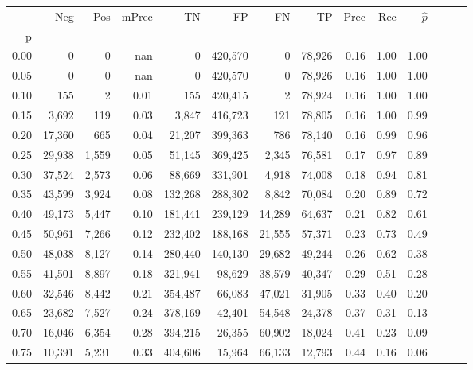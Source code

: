 \begin{tabular}{rrrrrrrrrrrrrr}
\toprule
{} &     Neg &    Pos & mPrec &       TN &       FP &      FN &      TP &  Prec &   Rec & $\hat{p}$ \\
p    &         &        &       &          &          &         &         &       &       &           \\
\midrule
0.00 &       0 &      0 &   nan &        0 &  420,570 &       0 &  78,926 &  0.16 &  1.00 &      1.00 \\
0.05 &       0 &      0 &   nan &        0 &  420,570 &       0 &  78,926 &  0.16 &  1.00 &      1.00 \\
0.10 &     155 &      2 &  0.01 &      155 &  420,415 &       2 &  78,924 &  0.16 &  1.00 &      1.00 \\
0.15 &   3,692 &    119 &  0.03 &    3,847 &  416,723 &     121 &  78,805 &  0.16 &  1.00 &      0.99 \\
0.20 &  17,360 &    665 &  0.04 &   21,207 &  399,363 &     786 &  78,140 &  0.16 &  0.99 &      0.96 \\
0.25 &  29,938 &  1,559 &  0.05 &   51,145 &  369,425 &   2,345 &  76,581 &  0.17 &  0.97 &      0.89 \\
0.30 &  37,524 &  2,573 &  0.06 &   88,669 &  331,901 &   4,918 &  74,008 &  0.18 &  0.94 &      0.81 \\
0.35 &  43,599 &  3,924 &  0.08 &  132,268 &  288,302 &   8,842 &  70,084 &  0.20 &  0.89 &      0.72 \\
0.40 &  49,173 &  5,447 &  0.10 &  181,441 &  239,129 &  14,289 &  64,637 &  0.21 &  0.82 &      0.61 \\
0.45 &  50,961 &  7,266 &  0.12 &  232,402 &  188,168 &  21,555 &  57,371 &  0.23 &  0.73 &      0.49 \\
0.50 &  48,038 &  8,127 &  0.14 &  280,440 &  140,130 &  29,682 &  49,244 &  0.26 &  0.62 &      0.38 \\
0.55 &  41,501 &  8,897 &  0.18 &  321,941 &   98,629 &  38,579 &  40,347 &  0.29 &  0.51 &      0.28 \\
0.60 &  32,546 &  8,442 &  0.21 &  354,487 &   66,083 &  47,021 &  31,905 &  0.33 &  0.40 &      0.20 \\
0.65 &  23,682 &  7,527 &  0.24 &  378,169 &   42,401 &  54,548 &  24,378 &  0.37 &  0.31 &      0.13 \\
0.70 &  16,046 &  6,354 &  0.28 &  394,215 &   26,355 &  60,902 &  18,024 &  0.41 &  0.23 &      0.09 \\
0.75 &  10,391 &  5,231 &  0.33 &  404,606 &   15,964 &  66,133 &  12,793 &  0.44 &  0.16 &      0.06 \\

\end{tabular}
